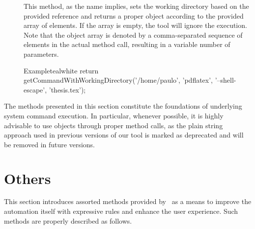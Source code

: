 \begin{description}
\item[] This method, as the name implies, sets the working directory based on the provided  reference and returns a proper  object according to the provided array of  elements. If the array is empty, the tool will ignore the execution. Note that the object array is denoted by a comma-separated sequence of elements in the actual method call, resulting in a variable number of parameters.

\begin{codebox}{Example}{teal}{\icnote}{white}
return getCommandWithWorkingDirectory('/home/paulo',
       'pdflatex', '--shell-escape', 'thesis.tex');
\end{codebox}
\end{description}

The methods presented in this section constitute the foundations of underlying system command execution. In particular, whenever possible, it is highly advisable to use  objects through proper  method calls, as the plain string approach used in previous versions of our tool is marked as deprecated and will be removed in future versions. 

\section{Others}
\label{sec:others}

This section introduces assorted methods provided by \arara\ as a means to improve the automation itself with expressive rules and enhance the user experience. Such methods are properly described as follows.

